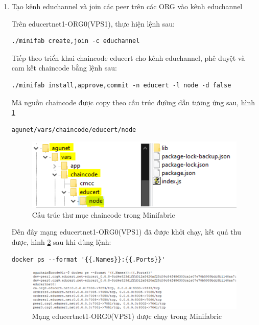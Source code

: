 \begin{enumerate}
\item Tạo kênh educhannel và join các peer trên các ORG vào kênh educhannel

Trên educertnet1-ORG0(VPS1), thực hiện lệnh sau:

    \begin{Verbatim}[fontsize=\small]
    ./minifab create,join -c educhannel
    \end{Verbatim}
    
Tiếp theo triển khai chaincode educert cho kênh educhannel, phê duyệt và cam kết chaincode bằng lệnh sau:
    \begin{Verbatim}[fontsize=\small]
    ./minifab install,approve,commit -n educert -l node -d false
    \end{Verbatim}

Mã nguồn chaincode được copy theo cấu trúc đường dẫn tương ứng sau, hình \ref{fig:chaincode_path_diagram}

    \begin{Verbatim}[fontsize=\small]
        agunet/vars/chaincode/educert/node
    \end{Verbatim}
    \begin{figure}[H]
    \centering
    \includegraphics[width=.8\linewidth]{img/chaincode_path.png}
    \caption{Cấu trúc thư mục chaincode trong Minifabric}
    \label{fig:chaincode_path_diagram}
    \end{figure}


    Đến đây mạng educertnet1-ORG0(VPS1) đã được khởi chạy, kết quả thu được, hình \ref{fig:educertnet1_diagram} sau khi dùng lệnh:

    \begin{Verbatim}[fontsize=\small]
        docker ps --format '{{.Names}}:{{.Ports}}'
    \end{Verbatim}
    \begin{figure}[H]
    \centering
    \includegraphics[width=.9\linewidth]{img/educertnet1.png}
    \caption{Mạng educertnet1-ORG0(VPS1) được chạy trong Minifabric}
    \label{fig:educertnet1_diagram}
    \end{figure}


\end{enumerate}
